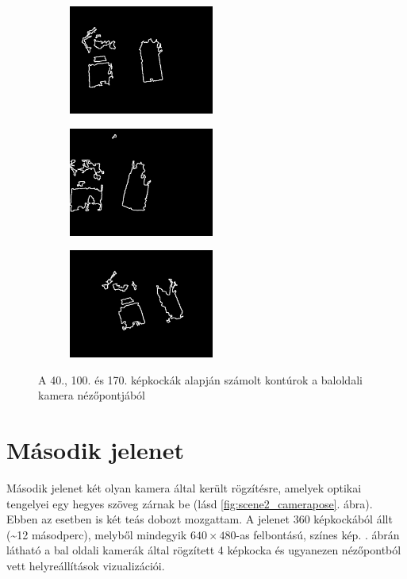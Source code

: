 \begin{figure}[t!]
\begin{subfigure}[b]{.32\linewidth}
	\centering
	\includegraphics[width=135pt]{figures/contour_93.png}
  \end{subfigure}
\begin{subfigure}[b]{.32\linewidth}
	\centering
	\includegraphics[width=135pt]{figures/contour_153.png}
  \end{subfigure}
\begin{subfigure}[b]{.32\linewidth}
	\centering
	\includegraphics[width=135pt]{figures/contour_223.png}
  \end{subfigure}
\caption{A 40., 100. és 170. képkockák alapján számolt kontúrok a baloldali kamera nézőpontjából \label{fig:scene1_contours}}

\end{figure}

\section{Második jelenet}

Második jelenet két olyan kamera által került rögzítésre, amelyek optikai tengelyei egy hegyes szöveg zárnak be (lásd \ref{fig:scene2_camerapose}. ábra). Ebben az esetben is két teás dobozt mozgattam. A jelenet 360 képkockából állt (\textasciitilde 12 másodperc), melyből mindegyik $640\times 480$-as felbontású, színes kép. . ábrán látható a bal oldali kamerák által rögzített 4 képkocka és ugyanezen nézőpontból vett helyreállítások vizualizációi.

